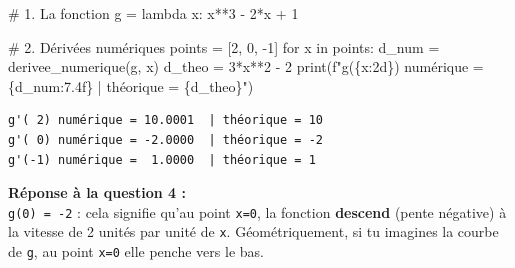 \documentclass[
  french,
  11pt,
  a4paper,
]{scrbook}
\newenvironment{Shaded}{}{}
\newcommand{\BuiltInTok}[1]{\textcolor[rgb]{0.84,0.23,0.29}{#1}}
\newcommand{\CommentTok}[1]{\textcolor[rgb]{0.42,0.45,0.49}{#1}}
\newcommand{\ControlFlowTok}[1]{\textcolor[rgb]{0.84,0.23,0.29}{#1}}
\newcommand{\DecValTok}[1]{\textcolor[rgb]{0.00,0.36,0.77}{#1}}
\newcommand{\KeywordTok}[1]{\textcolor[rgb]{0.84,0.23,0.29}{#1}}
\newcommand{\NormalTok}[1]{\textcolor[rgb]{0.14,0.16,0.18}{#1}}
\newcommand{\OperatorTok}[1]{\textcolor[rgb]{0.14,0.16,0.18}{#1}}
\newcommand{\SpecialCharTok}[1]{\textcolor[rgb]{0.00,0.36,0.77}{#1}}
\newcommand{\SpecialStringTok}[1]{\textcolor[rgb]{0.01,0.18,0.38}{#1}}
\begin{document}
\begin{tcolorbox}[enhanced jigsaw, arc=.35mm, bottomrule=.15mm, bottomtitle=1mm, breakable, colback=white, colbacktitle=quarto-callout-tip-color!10!white, colframe=quarto-callout-tip-color-frame, coltitle=black, left=2mm, leftrule=.75mm, opacityback=0, opacitybacktitle=0.6, rightrule=.15mm, title=\textcolor{quarto-callout-tip-color}{\faLightbulb}\hspace{0.5em}{✅ Voir la correction}, titlerule=0mm, toprule=.15mm, toptitle=1mm]

\begin{Shaded}
\begin{Highlighting}[]
\CommentTok{\# 1. La fonction}
\NormalTok{g }\OperatorTok{=} \KeywordTok{lambda}\NormalTok{ x: x}\OperatorTok{**}\DecValTok{3} \OperatorTok{{-}} \DecValTok{2}\OperatorTok{*}\NormalTok{x }\OperatorTok{+} \DecValTok{1}

\CommentTok{\# 2. Dérivées numériques}
\NormalTok{points }\OperatorTok{=}\NormalTok{ [}\DecValTok{2}\NormalTok{, }\DecValTok{0}\NormalTok{, }\OperatorTok{{-}}\DecValTok{1}\NormalTok{]}
\ControlFlowTok{for}\NormalTok{ x }\KeywordTok{in}\NormalTok{ points:}
\NormalTok{    d\_num }\OperatorTok{=}\NormalTok{ derivee\_numerique(g, x)}
\NormalTok{    d\_theo }\OperatorTok{=} \DecValTok{3}\OperatorTok{*}\NormalTok{x}\OperatorTok{**}\DecValTok{2} \OperatorTok{{-}} \DecValTok{2}
    \BuiltInTok{print}\NormalTok{(}\SpecialStringTok{f"g\textquotesingle{}(}\SpecialCharTok{\{}\NormalTok{x}\SpecialCharTok{:2d\}}\SpecialStringTok{) numérique = }\SpecialCharTok{\{}\NormalTok{d\_num}\SpecialCharTok{:7.4f\}}\SpecialStringTok{  | théorique = }\SpecialCharTok{\{}\NormalTok{d\_theo}\SpecialCharTok{\}}\SpecialStringTok{"}\NormalTok{)}
\end{Highlighting}
\end{Shaded}

\begin{verbatim}
g'( 2) numérique = 10.0001  | théorique = 10
g'( 0) numérique = -2.0000  | théorique = -2
g'(-1) numérique =  1.0000  | théorique = 1
\end{verbatim}

\textbf{Réponse à la question 4 :}\\
\texttt{g\textquotesingle{}(0)\ =\ -2} : cela signifie qu'au point
\texttt{x=0}, la fonction \textbf{descend} (pente négative) à la vitesse
de 2 unités par unité de \texttt{x}. Géométriquement, si tu imagines la
courbe de \texttt{g}, au point \texttt{x=0} elle penche vers le bas.

\end{tcolorbox}
\end{document}
